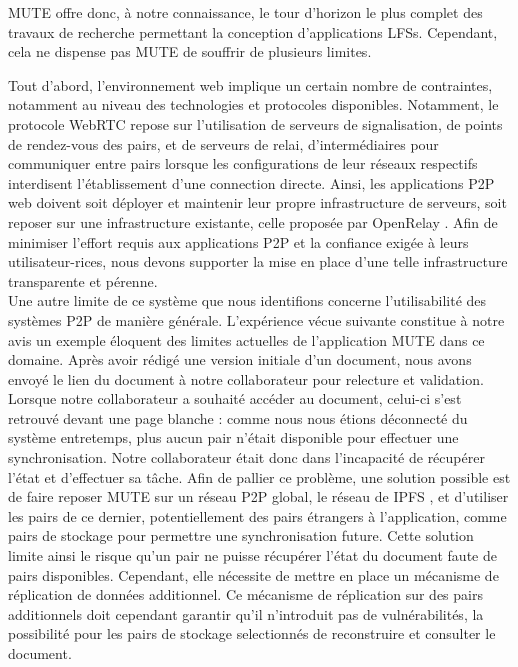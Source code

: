 \ac{MUTE} offre donc, à notre connaissance, le tour d'horizon le plus complet des travaux de recherche permettant la conception d'applications \acp{LFS}.
Cependant, cela ne dispense pas \ac{MUTE} de souffrir de plusieurs limites.

Tout d'abord, l'environnement web implique un certain nombre de contraintes, notamment au niveau des technologies et protocoles disponibles.
Notamment, le protocole WebRTC repose sur l'utilisation de serveurs de signalisation, \ie de points de rendez-vous des pairs, et de serveurs de relai, \ie d'intermédiaires pour communiquer entre pairs lorsque les configurations de leur réseaux respectifs interdisent l'établissement d'une connection directe.
Ainsi, les applications \ac{P2P} web doivent soit déployer et maintenir leur propre infrastructure de serveurs, soit reposer sur une infrastructure existante, \eg celle proposée par OpenRelay \cite{openrelay}.
Afin de minimiser l'effort requis aux applications \ac{P2P} et la confiance exigée à leurs utilisateur-rices, nous devons supporter la mise en place d'une telle infrastructure transparente et pérenne.\\

Une autre limite de ce système que nous identifions concerne l'utilisabilité des systèmes \ac{P2P} de manière générale.
L'expérience vécue suivante constitue à notre avis un exemple éloquent des limites actuelles de l'application \ac{MUTE} dans ce domaine.
Après avoir rédigé une version initiale d'un document, nous avons envoyé le lien du document à notre collaborateur pour relecture et validation.
Lorsque notre collaborateur a souhaité accéder au document, celui-ci s'est retrouvé devant une page blanche : comme nous nous étions déconnecté du système entretemps, \ie plus aucun pair n'était disponible pour effectuer une synchronisation.
Notre collaborateur était donc dans l'incapacité de récupérer l'état et d'effectuer sa tâche.
Afin de pallier ce problème, une solution possible est de faire reposer \ac{MUTE} sur un réseau \ac{P2P} global, \eg le réseau de \ac{IPFS} \cite{ipfs}, et d'utiliser les pairs de ce dernier, potentiellement des pairs étrangers à l'application, comme pairs de stockage pour permettre une synchronisation future.
Cette solution limite ainsi le risque qu'un pair ne puisse récupérer l'état du document faute de pairs disponibles.
Cependant, elle nécessite de mettre en place un mécanisme de réplication de données additionnel.
Ce mécanisme de réplication sur des pairs additionnels doit cependant garantir qu'il n'introduit pas de vulnérabilités, \eg la possibilité pour les pairs de stockage selectionnés de reconstruire et consulter le document.
